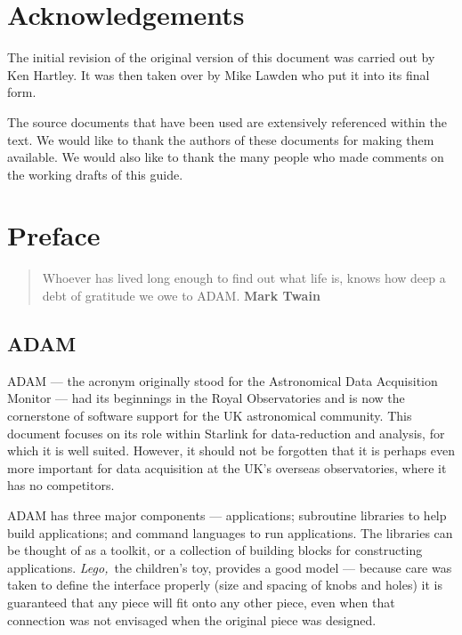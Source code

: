 \chapter*{Acknowledgements}

The initial revision of the original version of this document was carried out
by Ken Hartley.
It was then taken over by Mike Lawden who put it into its final form.

The source documents that have been used are extensively referenced within
the text.
We would like to thank the authors of these documents for making them
available.
We would also like to thank the many people who made comments on the 
working drafts of this guide.

\chapter*{Preface\label{C_pref}}

   \begin {quote} {\small {Whoever has lived long enough to find out 
                  what life is, knows how deep a debt of gratitude
                  we owe to ADAM.} \hfill {\small \bf Mark Twain} }
  \end{quote}

\section*{ADAM}
\label{S_preadam}

ADAM --- the acronym originally stood for the Astronomical Data Acquisition
Monitor --- had its beginnings in the Royal Observatories and is now the
cornerstone of software support for the UK astronomical community.
This document focuses on its role within Starlink for data-reduction and
analysis, for which it is well suited.
However, it should not be forgotten that it is perhaps even more important
for data acquisition at the UK's overseas observatories, where it has no
competitors.

ADAM has three major components --- applications; subroutine libraries 
to help build applications; and command languages to run applications.
The libraries can be thought of as a toolkit, or a collection of building
blocks for constructing applications.
{\em Lego,}\, the children's toy, provides a good model --- because care was
taken to define the interface properly (size and spacing of knobs and holes) it
is guaranteed that any piece will fit onto any other piece, even when that
connection was not envisaged when the original piece was designed.

